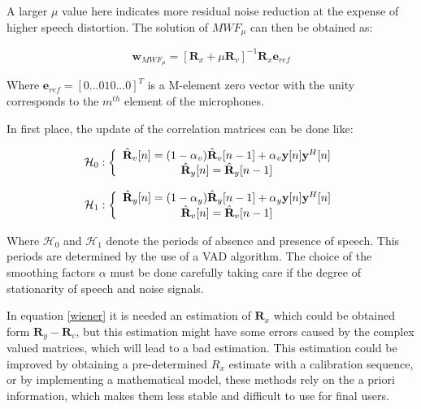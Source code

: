 A larger $\mu$ value here indicates more residual noise reduction at the expense of higher speech distortion. The solution of $MWF_\mu$ can then be obtained as:

\begin{equation}
\textbf{w}_{{MWF}_\mu} = [\textbf{R}_x+\mu \textbf{R}_v]^{-1}\textbf{R}_x\textbf{e}_{ref}
\label{wiener}
\end{equation}

Where $\textbf{e}_{ref}=[0...0 1 0...0]^T$ is a M-element zero vector with the unity corresponds to the $m^{th}$ element of the microphones. 


In first place, the update of the correlation matrices can be done like:

\begin{equation}
\mathcal{H}_0 : \left\{
\begin{array}{c l}
   \hat{\textbf{R}}_v[n]=(1-\alpha_v)\hat{\textbf{R}}_v[n-1]+\alpha_v\textbf{y}[n]\textbf{y}^H[n] \\
  \hat{\textbf{R}}_y[n]= \hat{\textbf{R}}_y[n-1]
\end{array}
\right.
\end{equation}

\begin{equation}
\mathcal{H}_1 : \left\{
\begin{array}{c l}
   \hat{\textbf{R}}_y[n]=(1-\alpha_y)\hat{\textbf{R}}_y[n-1]+\alpha_y\textbf{y}[n]\textbf{y}^H[n] \\
  \hat{\textbf{R}}_v[n]= \hat{\textbf{R}}_v[n-1]
\end{array}
\right.
\end{equation}

Where  $\mathcal{H}_0$  and  $\mathcal{H}_1$ denote the periods of absence and presence of speech. This periods are determined by the use of a VAD algorithm. The choice of the smoothing factors  $\alpha$ must be done carefully taking care if the  degree of stationarity of speech and noise signals.

In equation \eqref{wiener} it is needed an estimation of $\textbf{R}_x$ which could be obtained form $\textbf{R}_y-\textbf{R}_v$, but this estimation might have some errors caused by the complex valued matrices, which will lead to a bad estimation.  This estimation could be improved by obtaining a pre-determined $R_x$ estimate  with a calibration sequence, or by implementing a mathematical model, these methods rely on the a priori information, which makes them less stable and difficult to use for final users. 

